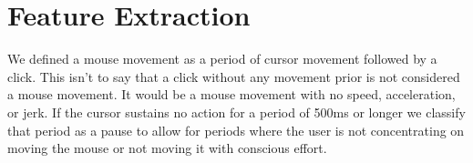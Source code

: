 \documentclass[conference]{IEEEtran}
\begin{document}
\bgroup
\def\arraystretch{1.5}
\egroup
{}


\section{Feature Extraction}
	We defined a mouse movement as a period of cursor movement followed by a click. This isn't to say that a click without any movement prior is not considered a mouse movement. It would be a mouse movement with no speed, acceleration, or jerk. If the cursor sustains no action for a period of 500ms or longer we classify that period as a pause to allow for periods where the user is not concentrating on moving the mouse or not moving it with conscious effort.
\end{document}
